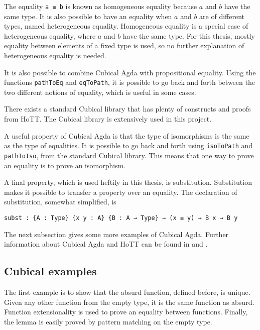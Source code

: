 The equality \texttt{a ≡ b} is known as homogeneous equality because $a$ and $b$ have the same type. It is also possible to have an equality when $a$ and $b$ are of different types, named heterogeneous equality. Homogeneous equality is a special case of heterogeneous equality, where $a$ and $b$ have the same type. For this thesis, mostly equality between elements of a fixed type is used, so no further explanation of heterogeneous equality is needed.

It is also possible to combine Cubical Agda with propositional equality. Using the functions \texttt{pathToEq} and \texttt{eqToPath}, it is possible to go back and forth between the two different notions of equality, which is useful in some cases.

There exists a standard Cubical library \cite{cubicalLibrary} that has plenty of constructs and proofs from HoTT. The Cubical library is extensively used in this project.

A useful property of Cubical Agda is that the type of isomorphisms is the same as the type of equalities. It is possible to go back and forth using \texttt{isoToPath} and \texttt{pathToIso}, from the standard Cubical library. This means that one way to prove an equality is to prove an isomorphism.

A final property, which is used heftily in this thesis, is substitution. Substitution makes it possible to transfer a property over an equality. The declaration of substitution, somewhat simplified, is 

\begin{verbatim}
subst : {A : Type} {x y : A} {B : A → Type} → (x ≡ y) → B x → B y
\end{verbatim}

The next subsection gives some more examples of Cubical Agda. Further information about Cubical Agda and HoTT can be found in  \cite{cubicalPaper} and \cite{hottBook}.

\subsection{Cubical examples}
The first example is to show that the absurd function, defined before, is unique. Given any other function from the empty type, it is the same function as absurd. Function extensionality is used to prove an equality between functions. Finally, the lemma is easily proved by pattern matching on the empty type.

